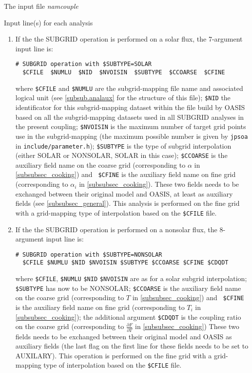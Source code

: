 \begin{subsection}{The input file {\it namcouple}}
\begin{subsubsection}{Input line(s) for each analysis}
\begin{itemize}
\begin{enumerate}
\item If the
the SUBGRID operation is performed on a solar flux, the 7-argument 
input line is:
\begin{verbatim}
# SUBGRID operation with $SUBTYPE=SOLAR 
  $CFILE  $NUMLU  $NID  $NVOISIN  $SUBTYPE  $CCOARSE  $CFINE
\end{verbatim}
where {\tt \$CFILE} and {\tt \$NUMLU} are the subgrid-mapping file name and 
associated logical unit (see \ref{subsub.analaux} for the structure 
of this file); 
{\tt \$NID} the identificator for this subgrid-mapping dataset 
 within the file build by OASIS based on all
the subgrid-mapping datasets used in all SUBGRID analyses in the present
coupling; {\tt \$NVOISIN} is the maximum number of target grid points
use in the subgrid-mapping (the maximum possible number is given by 
{\tt jpsoa} in {\tt include/parameter.h}); {\tt \$SUBTYPE} is the type
of subgrid
interpolation (either SOLAR or NONSOLAR, SOLAR in this case); 
{\tt \$CCOARSE} is the auxiliary field name on the coarse grid
(corresponding to $\alpha$ in \ref{subsubsec_cooking}) and {\tt
\$CFINE} is the auxiliary field name on fine grid (corresponding 
to $\alpha_i$ in \ref{subsubsec_cooking}). These two fields needs to
be exchanged between their original model and OASIS, at least as 
auxiliary fields (see \ref{subsubsec_general}). 
This analysis is performed on the fine 
grid with a
grid-mapping type of interpolation based on the {\tt \$CFILE} file.

\item If the
the SUBGRID operation is performed on a nonsolar flux, the 8-argument 
input line is:                      
\begin{verbatim}
# SUBGRID operation with $SUBTYPE=NONSOLAR
  $CFILE $NUMLU $NID $NVOISIN $SUBTYPE $CCOARSE $CFINE $CDQDT
\end{verbatim}
where {\tt \$CFILE},  {\tt \$NUMLU}  {\tt \$NID}  {\tt \$NVOISIN} 
are as for a solar subgrid interpolation; {\tt \$SUBTYPE} has now to be
NONSOLAR; {\tt \$CCOARSE} is the auxiliary field name on the coarse grid
(corresponding to $T$ in \ref{subsubsec_cooking}) and {\tt
\$CFINE} is the auxiliary field name on fine grid (corresponding 
to $T_i$ in \ref{subsubsec_cooking}); the additional argument {\tt \$CDQDT} is
the coupling ratio on the coarse grid (corresponding 
to $\frac{\partial F}{\partial T}$ in \ref{subsubsec_cooking})
These two fields needs to
be exchanged between their original model and OASIS as 
auxiliary fields (the last flag on the first line for these fields
needs to be set to AUXILARY). 
This operation is performed on the fine grid  with a
grid-mapping type of interpolation based on the {\tt \$CFILE} file.


\end{enumerate}
\end{itemize}
\end{subsubsection}
\end{subsection}
